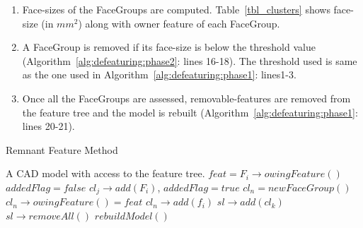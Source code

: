 \begin{enumerate}
\item Face-sizes of the FaceGroups are computed. Table~\ref{tbl_clusters} shows face-size (in $mm^2$) along with owner feature of each FaceGroup.
\item A FaceGroup is removed if its face-size is below the threshold value (Algorithm~\ref{alg:defeaturing:phase2}: lines 16-18). The threshold used is same as the one used in Algorithm~\ref{alg:defeaturing:phase1}: lines1-3.
\item Once all the FaceGroups are assessed, removable-features are removed from the feature tree and the model is rebuilt (Algorithm~\ref{alg:defeaturing:phase1}: lines 20-21).
\end{enumerate} 

\bigskip

\begin{algorithm}[H]
	\caption{Remnant Feature Method}
	\label{alg:defeaturing:phase2}
	\begin{algorithmic}[1]
		\REQUIRE A CAD model with access to the feature tree. 
			\STATE $feat = F_i \rightarrow owingFeature()$
			\STATE $addedFlag = false$
					\STATE  $cl_j \rightarrow add(F_i)$, $addedFlag = true$
				\ENDIF
			\ENDWHILE
				\STATE  $cl_n = newFaceGroup()$
				\STATE  $cl_n \rightarrow owingFeature() = feat$
				\STATE  $cl_n \rightarrow add(f_i)$
			\ENDIF
		\ENDWHILE
				\STATE   $sl \rightarrow add(cl_k)$
			\ENDIF			
		\ENDWHILE
		\STATE  $sl \rightarrow removeAll()$
		\STATE  $rebuildModel()$
	\end{algorithmic}
\end{algorithm}


\bigskip

